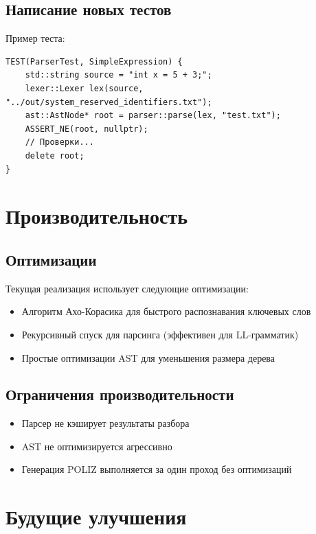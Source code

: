 \documentclass[12pt,a4paper]{article}
\begin{document}
\subsection{Написание новых тестов}

Пример теста:

\begin{lstlisting}
TEST(ParserTest, SimpleExpression) {
    std::string source = "int x = 5 + 3;";
    lexer::Lexer lex(source, "../out/system_reserved_identifiers.txt");
    ast::AstNode* root = parser::parse(lex, "test.txt");
    ASSERT_NE(root, nullptr);
    // Проверки...
    delete root;
}
\end{lstlisting}

\section{Производительность}

\subsection{Оптимизации}

Текущая реализация использует следующие оптимизации:

\begin{itemize}
    \item Алгоритм Ахо-Корасика для быстрого распознавания ключевых слов
    \item Рекурсивный спуск для парсинга (эффективен для LL-грамматик)
    \item Простые оптимизации AST для уменьшения размера дерева
\end{itemize}

\subsection{Ограничения производительности}

\begin{itemize}
    \item Парсер не кэширует результаты разбора
    \item AST не оптимизируется агрессивно
    \item Генерация POLIZ выполняется за один проход без оптимизаций
\end{itemize}

\section{Будущие улучшения}
\end{document}
